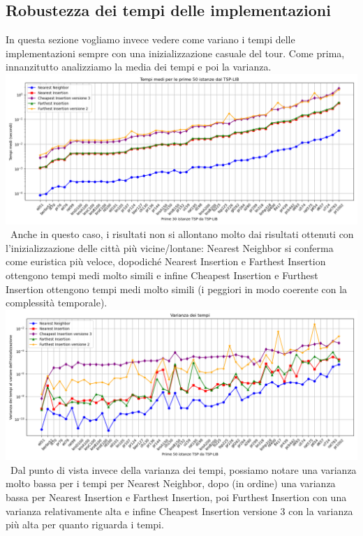 \documentclass[a4paper,12pt]{report}
\begin{document}
\subsection{Robustezza dei tempi delle implementazioni}
In questa sezione vogliamo invece vedere come variano i tempi delle implementazioni sempre con una inizializzazione casuale del tour. Come prima, innanzitutto analizziamo la media dei tempi e poi la varianza. \newline
\includegraphics[width=1\textwidth]{../Grafici/11.png} \
Anche in questo caso, i risultati non si allontano molto dai risultati ottenuti con l'inizializzazione delle città più vicine/lontane: Nearest Neighbor si conferma come euristica più veloce, dopodiché Nearest Insertion e Farthest Insertion ottengono tempi medi molto simili e infine Cheapest Insertion e Furthest Insertion ottengono tempi medi molto simili (i peggiori in modo coerente con la complessità temporale).  \newline
\includegraphics[width=1\textwidth]{../Grafici/12.png} \
Dal punto di vista invece della varianza dei tempi, possiamo notare una varianza molto bassa per i tempi per Nearest Neighbor, dopo (in ordine) una varianza bassa per Nearest Insertion e Farthest Insertion, poi Furthest Insertion con una varianza relativamente alta e infine Cheapest Insertion versione 3 con la varianza più alta per quanto riguarda i tempi.
\end{document}
